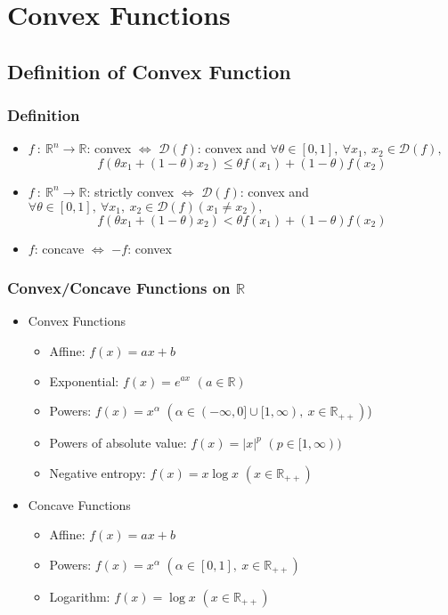 \section{Convex Functions}

\subsection{Definition of Convex Function}

\subsubsection*{Definition}
\begin{itemize}
    \item $f~:~\mathbb{R}^n \rightarrow \mathbb{R}$: convex $\Leftrightarrow$
    $\mathcal{D}(f)$: convex and $\forall \theta \in [0,1],~\forall x_1,~x_2 \in \mathcal{D}(f),$
    \begin{equation}
        f(\theta x_1 + (1 - \theta) x_2 ) \leq \theta f(x_1) + (1 - \theta)f(x_2)
    \end{equation}
    \item $f~:~\mathbb{R}^n \rightarrow \mathbb{R}$: strictly convex $\Leftrightarrow$
    $\mathcal{D}(f)$: convex and $\forall \theta \in [0,1],
    ~\forall x_1,~x_2 \in \mathcal{D}(f) (x_1 \neq x_2),$
    \begin{equation}
        f(\theta x_1 + (1 - \theta) x_2 ) < \theta f(x_1) + (1 - \theta)f(x_2)
    \end{equation}
    \item $f$: concave $\Leftrightarrow$ $-f$: convex
\end{itemize}

\subsubsection*{Convex/Concave Functions on $\mathbb{R}$}
\begin{itemize}
    \item Convex Functions
    \begin{itemize}
        \item Affine: $f(x) = ax + b$
        \item Exponential: $f(x) = e^{ax}$ $(a \in \mathbb{R})$
        \item Powers: $f(x) = x^\alpha$ $\left(\alpha \in (-\infty,0] \cup [1, \infty),~x \in \mathbb{R}_{++}\right)$)
        \item Powers of absolute value: $f(x) = |x|^p$ $(p \in [1,\infty))$
        \item Negative entropy: $f(x) = x \log x$ $(x \in \mathbb{R}_{++})$
    \end{itemize}
    \item Concave Functions
    \begin{itemize}
        \item Affine: $f(x) = ax + b$
        \item Powers: $f(x) = x^\alpha$ $\left(\alpha \in [0,1],~x \in \mathbb{R}_{++}\right)$
        \item Logarithm: $f(x) = \log x$ $(x \in \mathbb{R}_{++})$
    \end{itemize}
\end{itemize}

